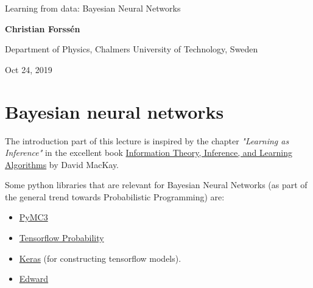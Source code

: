 \documentclass[%
oneside,                 %
final,                   %
10pt]{article}
\begin{document}

\newcommand{\exercisesection}[1]{\subsection*{#1}}







\thispagestyle{empty}

\begin{center}
{\LARGE\bf
\begin{spacing}{1.25}
Learning from data: Bayesian Neural Networks
\end{spacing}
}
\end{center}


\begin{center}
{\bf Christian Forssén}
\end{center}

    \begin{center}
\centerline{{\small Department of Physics, Chalmers University of Technology, Sweden}}
\end{center}
    

\begin{center}
Oct 24, 2019
\end{center}

\vspace{1cm}


\section{Bayesian neural networks}
The introduction part of this lecture is inspired by the chapter \emph{"Learning as Inference"} in the excellent book \href{{http://www.inference.org.uk/mackay/itila/}}{Information Theory, Inference, and Learning Algorithms} by David MacKay.

Some python libraries that are relevant for Bayesian Neural Networks (as part of the general trend towards Probabilistic Programming) are:
\begin{itemize}
\item \href{{https://docs.pymc.io/}}{PyMC3}

\item \href{{https://www.tensorflow.org/probability}}{Tensorflow Probability}

\item \href{{https://keras.io/}}{Keras} (for constructing tensorflow models).

\item \href{{http://edwardlib.org/}}{Edward}
\end{itemize}
\end{document}
